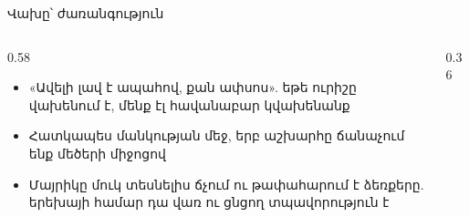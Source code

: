 \begin{frame}{Վախը՝ ժառանգություն}
  \begin{columns}[c]
    \begin{column}{0.58\textwidth}
      \begin{itemize}
        \item «Ավելի լավ է ապահով, քան ափսոս». եթե ուրիշը վախենում է, մենք էլ հավանաբար կվախենանք
        \item<2-> Հատկապես մանկության մեջ, երբ աշխարհը ճանաչում ենք մեծերի միջոցով
        \item<3-> Մայրիկը մուկ տեսնելիս ճչում ու թափահարում է ձեռքերը. երեխայի համար դա վառ ու ցնցող տպավորություն է
      \end{itemize}
    \end{column}
    \begin{column}{0.36\textwidth}
      \centering
      \ \raisebox{0.3cm}{$\rightarrow$}\ \par\medskip
    \end{column}
  \end{columns}
\end{frame}

\begin{frame}
\end{frame}

